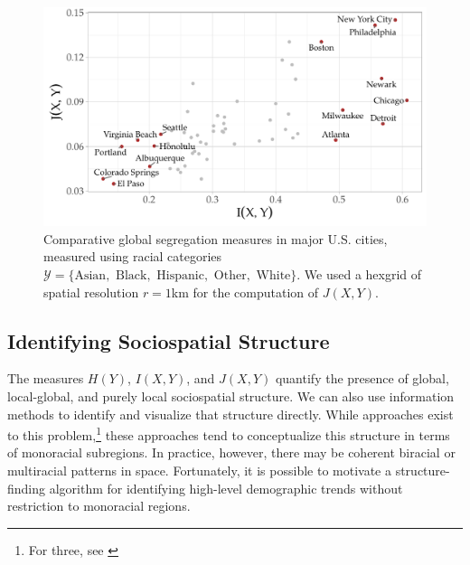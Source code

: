 \documentclass[9pt,twocolumn,twoside]{pnas-new}
\begin{document}
	\begin{figure}
		\includegraphics[width=\linewidth]{figs/mutual_fisher.pdf}
		\caption{
			Comparative global segregation measures in major U.S. cities, measured using racial categories $\mathcal{Y} = \{\text{Asian}, \text{ Black}, \text{ Hispanic}, \text{ Other}, \text{ White}\}$. 
			We used a hexgrid of spatial resolution $r = 1$km for the computation of $J(X,Y)$.
		} \label{fig:mutual_fisher}
	\end{figure}

\subsection*{Identifying Sociospatial Structure} 
	The measures $H(Y)$, $I(X,Y)$, and $J(X,Y)$ quantify the presence of global, local-global, and purely local sociospatial structure. We can also use information methods to identify and visualize that structure directly. While approaches exist to this problem,\footnote{For three, see \cite{Logan2011}} these approaches tend to conceptualize this structure in terms of monoracial subregions. In practice, however, there may be coherent biracial or multiracial patterns in space. Fortunately, it is possible to motivate a structure-finding algorithm for identifying high-level demographic trends without restriction to monoracial regions. 
\end{document}
